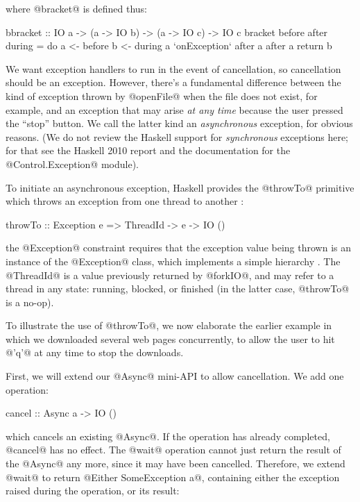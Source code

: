 \noindent where @bracket@ is defined thus:

\begin{haskell}
bbracket :: IO a -> (a -> IO b) -> (a -> IO c) -> IO c
bracket before after during = do
  a <- before
  b <- during a `onException` after a
  after a
  return b
\end{haskell}

We want exception handlers to run in the event of cancellation, so
cancellation should be an exception.  However, there's a fundamental
difference between the kind of exception thrown by @openFile@ when the
file does not exist, for example, and an exception that may arise
\emph{at any time} because the user pressed the ``stop'' button.  We
call the latter kind an \emph{asynchronous} exception, for obvious
reasons.  (We do not review the Haskell support for \emph{synchronous}
exceptions here; for that see the Haskell 2010 report
\cite{haskell2010} and the documentation for the @Control.Exception@
module).

To initiate an asynchronous exception, Haskell provides the @throwTo@
primitive which throws an exception from one thread to
another \cite{spj:asynch-exceptions}:

\begin{haskell}
throwTo :: Exception e => ThreadId -> e -> IO ()
\end{haskell}

\noindent the @Exception@ constraint requires that the exception value
being thrown is an instance of the @Exception@ class, which implements
a simple hierarchy \cite{extensible-exceptions}.  The @ThreadId@ is a
value previously returned by @forkIO@, and may refer to a thread in
any state: running, blocked, or finished (in the latter case,
@throwTo@ is a no-op).

To illustrate the use of @throwTo@, we now elaborate the earlier
example in which we downloaded several web pages concurrently, to
allow the user to hit @'q'@ at any time to stop the downloads.

First, we will extend our @Async@ mini-API to allow cancellation.  We
add one operation:

\begin{haskell}
cancel :: Async a -> IO ()
\end{haskell}

\noindent which cancels an existing @Async@.  If the operation has
already completed, @cancel@ has no effect.  The @wait@ operation
cannot just return the result of the @Async@ any more, since it may
have been cancelled.  Therefore, we extend @wait@ to return
@Either SomeException a@, containing either the exception raised during the
operation, or its result:

